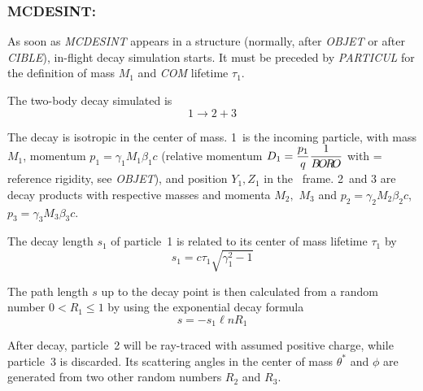 \bigskip





\newpage

\subsubsection*{MCDESINT: \MCDESINTTitl \protect\cite{Biblio11}}
\label{MCDESINT}

 As soon as \textsl{MCDESINT}  appears in a structure
(normally, after \textsl{OBJET} or after \textsl{CIBLE}),
 in-flight decay simulation starts. 
It must be preceded by \textsl{PARTICUL} for the definition of mass $ M_1 $ 
and \textsl{COM} 
lifetime $\tau_1$. 

\noindent The two-body decay simulated is 
 $$ 1 \longrightarrow  2+3 $$

\noindent The decay is isotropic in the center of mass. 
1~is the incoming particle, with mass $ M_1 $, momentum $ p_1=\gamma_1 M_1\beta_ 1c $ (relative 
momentum $ D_1= \dfrac{p_1 }{ q} \dfrac{1 }{B\!O\!R\!O} $ with \BORO   = reference
rigidity, see \textsl{OBJET}),  and position $ Y_1,Z_1 $ in the \zgou\ frame. 
2~and 3 are decay products with respective masses and momenta $ M_2, $ $ M_3 $ and 
$ p_2=\gamma_ 2M_2\beta_2c$,  $ p_3=\gamma_ 3M_3\beta_ 3c$.  

\noindent The decay length  $ s_1 $ of particle~1 is related to its center of 
mass lifetime $ \tau_ 1 $ by 
$$ s_1=c\tau_ 1 \sqrt{ \gamma^ 2_1 -1} $$

\noindent The path length $ s $ up to the decay point is then calculated from
a random number $ 0<R_1\leq 1 $ by using the exponential decay formula
$$ s = - s_1 \ell n R_1 $$

\noindent After decay, particle~2  will  be ray-traced with assumed positive
charge, while particle~3 is discarded.  Its scattering angles in the center of mass 
$ \theta^\ast $ and $\phi$ are generated from two other random numbers 
$R_2$ and $ R_3$. 
%
%

